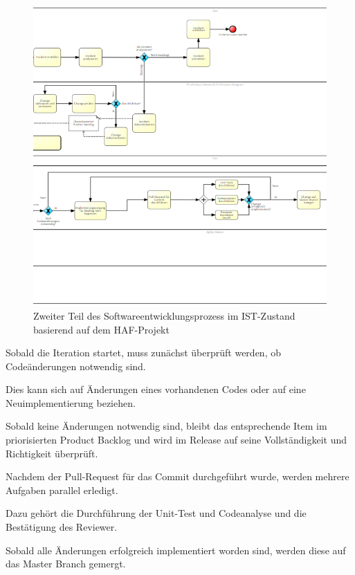 \begin{figure}[h]
    \centering
    \includegraphics[scale=0.8]{Bilder/IST-Prozess_second Part.png}
    \caption{Zweiter Teil des Softwareentwicklungsprozess im IST-Zustand basierend auf dem HAF-Projekt}
\end{figure}

Sobald die Iteration startet, muss zunächst überprüft werden, ob Codeänderungen notwendig sind. 

Dies kann sich auf Änderungen eines vorhandenen Codes oder auf eine Neuimplementierung beziehen. 

Sobald keine Änderungen notwendig sind, bleibt das entsprechende Item im priorisierten Product Backlog und wird im Release auf seine Vollständigkeit und Richtigkeit überprüft.

Nachdem der Pull-Request für das Commit durchgeführt wurde, werden mehrere Aufgaben parallel erledigt. 

Dazu gehört die Durchführung der Unit-Test und Codeanalyse und die Bestätigung des Reviewer.

Sobald alle Änderungen erfolgreich implementiert worden sind, werden diese auf das Master Branch gemergt. 

